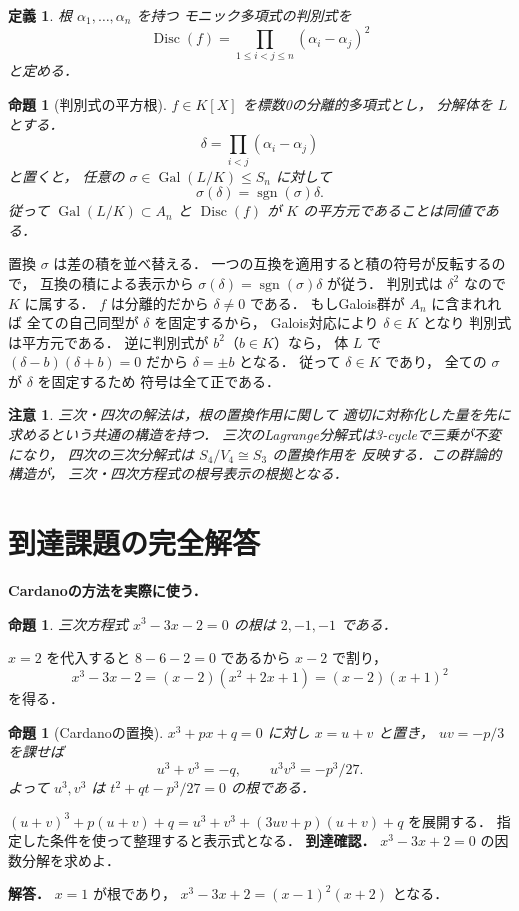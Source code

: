 \documentclass[a5paper,10pt,onecolumn]{jsarticle}
\makeatletter
\theoremstyle{mathnotetheorem}
\newtheorem{definition}[theorem]{定義}
\newtheorem{proposition}[theorem]{命題}
\newtheorem{remark}[theorem]{注意}
\renewcommand{\proofname}{証明}
\renewenvironment{proof}[1][\proofname]{%
  \par\pushQED{\qed}\normalfont\topsep4\p@\@plus2\p@\relax
  \trivlist\item[\hskip\labelsep\bfseries #1]\ignorespaces
}{\popQED\endtrivlist\@endpefalse}
\makeatother
\begin{document}
\begin{definition}
根 $\alpha_1,\dots,\alpha_n$ を持つ
モニック多項式の判別式を
\[
 \operatorname{Disc}(f)
 =\prod_{1\le i<j\le n}(\alpha_i-\alpha_j)^2
\]
と定める．
\end{definition}

\begin{proposition}[判別式の平方根]\label{prop:disc}
$f\in K[X]$ を標数0の分離的多項式とし，
分解体を $L$ とする．
\[
 \delta=\prod_{i<j}(\alpha_i-\alpha_j)
\]
と置くと，
任意の $\sigma\in\operatorname{Gal}(L/K)\le S_n$ に対して
\[
 \sigma(\delta)=\operatorname{sgn}(\sigma)\delta.
\]
従って
$\operatorname{Gal}(L/K)\subset A_n$ と
$\operatorname{Disc}(f)$ が $K$ の平方元であることは同値である．
\end{proposition}
\begin{proof}
置換 $\sigma$ は差の積を並べ替える．
一つの互換を適用すると積の符号が反転するので，
互換の積による表示から
$\sigma(\delta)=\operatorname{sgn}(\sigma)\delta$
が従う．
判別式は $\delta^2$ なので $K$ に属する．
$f$ は分離的だから $\delta\ne0$ である．
もしGalois群が $A_n$ に含まれれば
全ての自己同型が $\delta$ を固定するから，
Galois対応により $\delta\in K$ となり
判別式は平方元である．
逆に判別式が $b^2$（$b\in K$）なら，
体 $L$ で $(\delta-b)(\delta+b)=0$ だから
$\delta=\pm b$ となる．
従って $\delta\in K$ であり，
全ての $\sigma$ が $\delta$ を固定するため
符号は全て正である．
\end{proof}

\begin{remark}
三次・四次の解法は，根の置換作用に関して
適切に対称化した量を先に求めるという共通の構造を持つ．
三次のLagrange分解式は3-cycleで三乗が不変になり，
四次の三次分解式は $S_4/V_4\cong S_3$ の置換作用を
反映する．この群論的構造が，
三次・四次方程式の根号表示の根拠となる．
\end{remark}

\section{到達課題の完全解答}
\noindent\textbf{Cardanoの方法を実際に使う．}
\begin{proposition}
三次方程式 $x^3-3x-2=0$ の根は
$2,-1,-1$ である．
\end{proposition}
\begin{proof}
$x=2$ を代入すると $8-6-2=0$ であるから
$x-2$ で割り，
\[
x^3-3x-2=(x-2)(x^2+2x+1)
=(x-2)(x+1)^2
\]
を得る．
\end{proof}
\begin{proposition}[Cardanoの置換]
$x^3+px+q=0$ に対し $x=u+v$ と置き，
$uv=-p/3$ を課せば
\[
u^3+v^3=-q,\qquad
u^3v^3=-p^3/27.
\]
よって $u^3,v^3$ は
$t^2+qt-p^3/27=0$ の根である．
\end{proposition}
\begin{proof}
$(u+v)^3+p(u+v)+q
=u^3+v^3+(3uv+p)(u+v)+q$ を展開する．
指定した条件を使って整理すると表示式となる．
\end{proof}
\noindent\textbf{到達確認．}
$x^3-3x+2=0$ の因数分解を求めよ．
\par\noindent\textbf{解答．}
$x=1$ が根であり，
$x^3-3x+2=(x-1)^2(x+2)$ となる．
\end{document}
